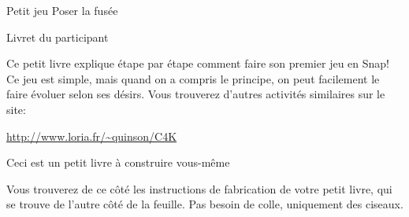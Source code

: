 \documentclass[a4paper,12pt]{article}
\begin{document}
\begin{center}
  {\Huge Petit jeu \og Poser la fusée \fg{}}

  \bigskip
  {\Large Livret du participant}
  \vspace{-\baselineskip}
\end{center}

\large

Ce petit livre explique étape par étape comment faire son premier jeu en Snap!
Ce jeu est simple, mais quand on a compris le principe, on peut facilement le
faire évoluer selon ses désirs. Vous trouverez d'autres activités similaires
sur le site:

\centerline{\color{blue}\url{http://www.loria.fr/~quinson/C4K}}

\bigskip\bigskip
\bigskip\bigskip

\centerline{\Large Ceci est un petit livre à construire vous-même}


Vous trouverez de ce côté les instructions de fabrication de votre
petit livre, qui se trouve de l'autre côté de la feuille. Pas besoin
de colle, uniquement des ciseaux.

\bigskip\bigskip
\end{document}
